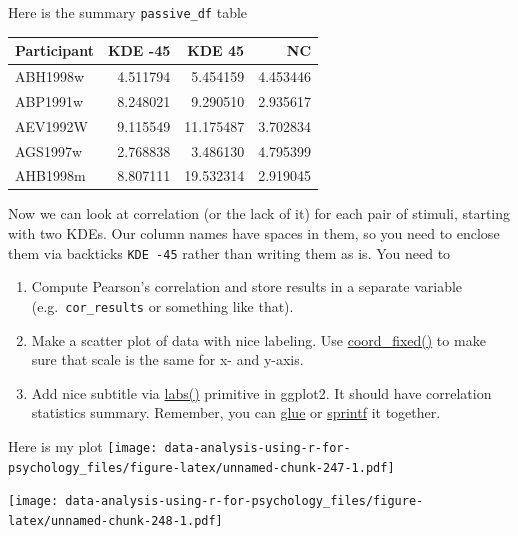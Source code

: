 \documentclass[
]{book}
\providecommand{\tightlist}{%
  \setlength{\itemsep}{0pt}\setlength{\parskip}{0pt}}
\begin{document}
Here is the summary \texttt{passive\_df} table

\begin{tabular}{l|r|r|r}
\hline
Participant & KDE -45 & KDE 45 & NC\\
\hline
ABH1998w & 4.511794 & 5.454159 & 4.453446\\
\hline
ABP1991w & 8.248021 & 9.290510 & 2.935617\\
\hline
AEV1992W & 9.115549 & 11.175487 & 3.702834\\
\hline
AGS1997w & 2.768838 & 3.486130 & 4.795399\\
\hline
AHB1998m & 8.807111 & 19.532314 & 2.919045\\
\hline
\end{tabular}

Now we can look at correlation (or the lack of it) for each pair of stimuli, starting with two KDEs. Our column names have spaces in them, so you need to enclose them via backticks \texttt{\textasciigrave{}KDE\ -45\textasciigrave{}} rather than writing them as is. You need to

\begin{enumerate}
\def\labelenumi{\arabic{enumi}.}
\tightlist
\item
  Compute Pearson's correlation and store results in a separate variable (e.g.~\texttt{cor\_results} or something like that).
\item
  Make a scatter plot of data with nice labeling. Use \href{https://ggplot2.tidyverse.org/reference/coord_fixed.html}{coord\_fixed()} to make sure that scale is the same for x- and y-axis.
\item
  Add nice subtitle via \href{https://ggplot2.tidyverse.org/reference/labs.html}{labs()} primitive in ggplot2. It should have correlation statistics summary. Remember, you can \protect\hyperlink{glue}{glue} or \protect\hyperlink{sprintf}{sprintf} it together.
\end{enumerate}

Here is my plot
\texttt{[image: data-analysis-using-r-for-psychology\_files/figure-latex/unnamed-chunk-247-1.pdf]}

\texttt{[image: data-analysis-using-r-for-psychology\_files/figure-latex/unnamed-chunk-248-1.pdf]}

  
\end{document}
